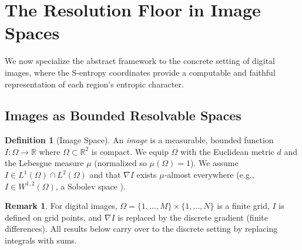 \documentclass[twocolumn]{article}
\theoremstyle{plain}
\theoremstyle{definition}
\newtheorem{definition}[theorem]{Definition}
\newtheorem{remark}[theorem]{Remark}
\newcommand{\reals}{\mathbb{R}}
\begin{document}
\section{The Resolution Floor in Image Spaces}
\label{sec:resolution}

We now specialize the abstract framework to the concrete setting of digital images,
where the S-entropy coordinates provide a computable and faithful representation
of each region's entropic character.

\subsection{Images as Bounded Resolvable Spaces}

\begin{definition}[Image Space]
\label{def:imagespace}
An \emph{image} is a measurable, bounded function $I: \Omega \to \reals$ where
$\Omega \subset \reals^2$ is compact. We equip $\Omega$ with the Euclidean
metric $d$ and the Lebesgue measure $\mu$ (normalized so $\mu(\Omega) = 1$).
We assume $I \in L^1(\Omega) \cap L^2(\Omega)$ and that $\nabla I$ exists
$\mu$-almost everywhere (e.g., $I \in W^{1,2}(\Omega)$, a Sobolev space
\cite{evans2010partial}).
\end{definition}

\begin{remark}
For digital images, $\Omega = \{1,\ldots,M\} \times \{1,\ldots,N\}$ is a finite
grid, $I$ is defined on grid points, and $\nabla I$ is replaced by the discrete
gradient (finite differences). All results below carry over to the discrete
setting by replacing integrals with sums.
\end{remark}
\end{document}
